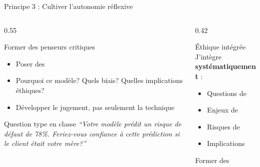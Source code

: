\documentclass[aspectratio=169,11pt]{beamer}
\begin{document}
\begin{frame}{Principe 3 : Cultiver l'autonomie réflexive}
  \begin{columns}[T]
    \begin{column}{0.55\textwidth}
      \begin{block}{Former des penseurs critiques}
        \begin{itemize}
          \item Poser des 
          \item Pourquoi ce modèle? Quels biais? Quelles implications éthiques?
          \item Développer le jugement, pas seulement la technique
        \end{itemize}
      \end{block}
      
      \vspace{0.3em}
      
      \begin{exampleblock}{Question type en classe}
        \small
        \textit{``Votre modèle prédit un risque de défaut de 78\%. Feriez-vous confiance à cette prédiction si le client était votre mère?''}
      \end{exampleblock}
    \end{column}
    \begin{column}{0.42\textwidth}
      \begin{alertblock}{Éthique intégrée}
        J'intègre \textbf{systématiquement} :
        \begin{itemize}
          \item Questions de 
          \item Enjeux de 
          \item Risques de 
          \item Implications 
        \end{itemize}
      \end{alertblock}
      
      \vspace{0.3em}
      
      {\small Former des }
    \end{column}
  \end{columns}
\end{frame}
\end{document}
